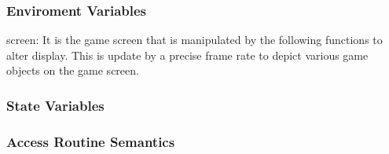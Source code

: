 \documentclass[12pt]{article}
\begin{document}
\subsubsection*{Enviroment Variables}
screen: It is the game screen that is manipulated by the following functions to alter display. This is update by a precise frame rate to depict various game objects on the game screen.

\subsubsection*{State Variables}








\subsubsection*{Access Routine Semantics}

\end{document}
